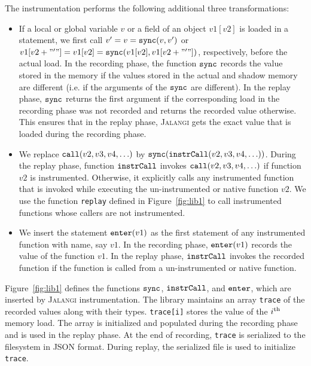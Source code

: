 \documentclass{sig-alternate}
\def\jalangi{\textsc{Jalangi}}
\newcommand \dsl [1] {\ensuremath{{\tt #1}}\xspace}
\newcommand \Sync{\dsl{sync}}
\newcommand \Enter{\dsl{enter}}
\begin{document}
The instrumentation performs the following additional three
transformations:

\begin{itemize}
\item If a local or global variable $v$ or a field of an object
  $v1[v2]$ is loaded in a statement, we first call $v' = v = \Sync(v,
  v')$ or $v1[v2+"'"] = v1[v2] = \Sync(v1[v2], v1[v2+"'"])$,
  respectively, before the actual load.  In the recording phase, the
  function $\Sync$ records the value stored in the memory if the
  values stored in the actual and shadow memory are different (i.e. if
  the arguments of the $\Sync$ are different).  In the replay phase,
  $\Sync$ returns the first argument if the corresponding load in the
  recording phase was not recorded and returns the recorded value
  otherwise.  This ensures that in the replay phase, \jalangi{} gets
  the exact value that is loaded during the recording phase.
\item We replace $\dsl{call}(v2, v3, v4, \ldots)$ by
  $\Sync(\dsl{instrCall}(v2, v3, v4, \ldots))$. During the replay
  phase, function $\dsl{instrCall}$ invokes $\dsl{call}(v2, v3, v4,
  \ldots)$ if function $v2$ is instrumented.  Otherwise, it explicitly
  calls any instrumented function that is invoked while executing the
  un-instrumented or native function $v2$.  We use the function
  \texttt{replay} defined in Figure~\ref{fig:lib1} to call
  instrumented functions whose callers are not instrumented.
\item We insert the statement $\Enter(v1)$ as the first statement of
  any instrumented function with name, say $v1$.  In the recording
  phase, $\Enter(v1)$ records the value of the function $v1$.  In the
  replay phase, $\dsl{instrCall}$ invokes the recorded function if the
  function is called from a un-instrumented or native function.
\end{itemize}


Figure~\ref{fig:lib1} defines the functions $\Sync$,
$\dsl{instrCall}$, and $\Enter$, which are inserted by \jalangi{}
instrumentation.  The library maintains an array \texttt{trace} of the
recorded values along with their types.  \texttt{trace[i]} stores the
value of the $i^{\rm th}$ memory load.  The array is initialized and
populated during the recording phase and is used in the replay phase.
At the end of recording, \texttt{trace} is serialized to the
filesystem in JSON format.  During replay, the serialized file is used
to initialize \texttt{trace}.
\end{document}
